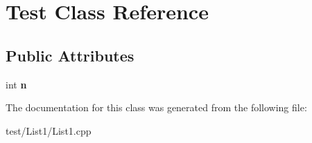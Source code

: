 \hypertarget{classTest}{}\section{Test Class Reference}
\label{classTest}
\subsection*{Public Attributes}
\begin{DoxyCompactItemize}
\item 
int {\bfseries n}\hypertarget{classTest_ac8864351911802cace45041906403607}{}\label{classTest_ac8864351911802cace45041906403607}

\end{DoxyCompactItemize}


The documentation for this class was generated from the following file\+:\begin{DoxyCompactItemize}
\item 
test/\+List1/List1.\+cpp\end{DoxyCompactItemize}
